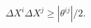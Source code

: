 \begin{equation}
\Delta X^{i}\Delta X^{j}\geq\left|  \theta^{ij}\right|  /2.\label{29.5}%
\end{equation}


